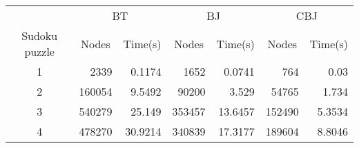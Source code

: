 
    \begin{tabular}{crrrrrr}
      \cellcolor[gray]{0.7} & \multicolumn{2}{c}{BT\cellcolor[gray]{0.7}} & \multicolumn{2}{c}{BJ\cellcolor[gray]{0.7}}  & \multicolumn{2}{c}{CBJ\cellcolor[gray]{0.7}} \\
      \cellcolor[gray]{0.7} Sudoku puzzle & \multicolumn{1}{c}{\cellcolor[gray]{0.7}Nodes} & \multicolumn{1}{c}{\cellcolor[gray]{0.7}Time(s)} & \multicolumn{1}{c}{\cellcolor[gray]{0.7}Nodes} & \multicolumn{1}{c}{\cellcolor[gray]{0.7}Time(s)} & \multicolumn{1}{c}{\cellcolor[gray]{0.7}Nodes} & \multicolumn{1}{c}{\cellcolor[gray]{0.7}Time(s)} \\
      1 & 2339 & 0.1174 & 1652 & 0.0741 & 764 & 0.03\\
      2 & 160054 & 9.5492 & 90200 & 3.529 & 54765 & 1.734\\
      3 & 540279 & 25.149 & 353457 & 13.6457 & 152490 & 5.3534\\
      4 & 478270 & 30.9214 & 340839 & 17.3177 & 189604 & 8.8046\\
    \end{tabular}